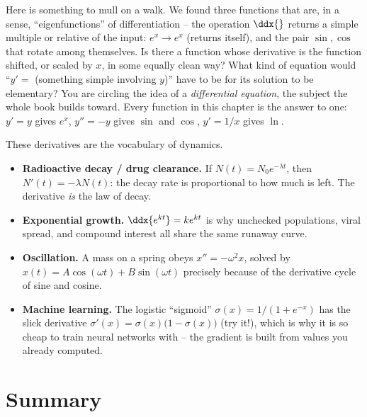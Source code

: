 \begin{walkbox}
Here is something to mull on a walk. We found three functions that are, in a
sense, ``eigenfunctions'' of differentiation -- the operation
$\ddx{}$ returns a simple multiple or relative of the input:
$e^x\to e^x$ (returns itself), and the pair $\sin,\cos$ that rotate among
themselves. Is there a function whose derivative is the function shifted, or
scaled by $x$, in some equally clean way? What kind of equation would
``$y' = $ (something simple involving $y$)'' have to be for its solution to
be elementary? You are circling the idea of a \emph{differential equation},
the subject the whole book builds toward. Every function in this chapter is
the answer to one: $y'=y$ gives $e^x$, $y''=-y$ gives $\sin$ and $\cos$,
$y'=1/x$ gives $\ln$.
\end{walkbox}

\begin{applicationbox}
These derivatives are the vocabulary of dynamics.
\begin{itemize}
\item \textbf{Radioactive decay / drug clearance.} If $N(t)=N_0 e^{-\lambda t}$,
then $N'(t) = -\lambda N(t)$: the decay rate is proportional to how much is
left. The derivative \emph{is} the law of decay.
\item \textbf{Exponential growth.} $\ddx{e^{kt}}=ke^{kt}$ is why unchecked
populations, viral spread, and compound interest all share the same runaway
curve.
\item \textbf{Oscillation.} A mass on a spring obeys $x''=-\omega^2 x$, solved
by $x(t)=A\cos(\omega t)+B\sin(\omega t)$ precisely because of the
derivative cycle of sine and cosine.
\item \textbf{Machine learning.} The logistic ``sigmoid''
$\sigma(x)=1/(1+e^{-x})$ has the slick derivative
$\sigma'(x)=\sigma(x)\big(1-\sigma(x)\big)$ (try it!), which is why it is so
cheap to train neural networks with -- the gradient is built from values you
already computed.
\end{itemize}
\end{applicationbox}

\section{Summary}
\label{ch12:summary}

